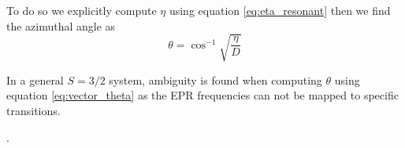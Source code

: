 To do so we explicitly compute $\eta$ using equation \eqref{eq:eta_resonant} then we find the azimuthal angle as
\begin{equation}
	\theta = \cos^{-1}\sqrt{\frac{\eta}{D}}
	\label{eq:vector_theta}
\end{equation}


%
In a general $S = 3/2$ system, ambiguity is found when computing $\theta$ using equation \eqref{eq:vector_theta} as the EPR frequencies can not be mapped to specific transitions.

.

